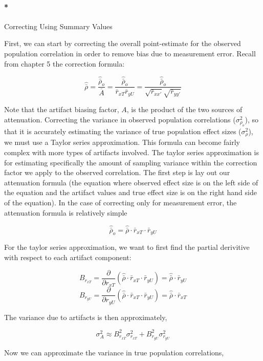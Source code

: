 \documentclass[
  letterpaper,
  DIV=11,
  numbers=noendperiod]{scrreprt}
\let\oldparagraph\paragraph
\renewcommand{\paragraph}[1]{\oldparagraph{#1}\mbox{}}
\begin{document}
\paragraph*{Correcting Using Summary
Values}\label{correcting-using-summary-values}

First, we can start by correcting the overall point-estimate for the
observed population correlation in order to remove bias due to
measurement error. Recall from chapter 5 the correction formula:

\[
\hat{\bar{\rho}} = \frac{\hat{\bar{\rho}}_o}{\bar{A}} = \frac{\hat{\bar{\rho}}_o}{\bar{r}_{xT} \bar{r}_{yU}} = \frac{\hat{\bar{\rho}}_o}{\sqrt{\bar{r}_{xx'}} \sqrt{\bar{r}_{yy'}}}
\]

Note that the artifact biasing factor, \(A\), is the product of the two
sources of attenuation. Correcting the variance in observed population
correlations (\(\sigma^2_{\rho_o}\)), so that it is accurately
estimating the variance of true population effect sizes
(\(\sigma^2_{\rho}\)), we must use a Taylor series approximation. This
formula can become fairly complex with more types of artifacts involved.
The taylor series approximation is for estimating specifically the
amount of sampling variance within the correction factor we apply to the
observed correlation. The first step is lay out our attenuation formula
(the equation where observed effect size is on the left side of the
equation and the artifact values and true effect size is on the right
hand side of the equation). In the case of correcting only for
measurement error, the attenuation formula is relatively simple

\[
\hat{\bar{\rho}}_o = \hat{\bar{\rho}}\cdot \bar{r}_{xT}\cdot \bar{r}_{yU}
\]

For the taylor series approximation, we want to first find the partial
derivitive with respect to each artifact component:

\[
B_{r_{xT}}=\frac{\partial}{\partial r_{xT}} (\hat{\bar{\rho}}\cdot \bar{r}_{xT}\cdot \bar{r}_{yU}) = \hat{\bar{\rho}}\cdot \bar{r}_{yU}
\] \[
B_{r_{yU}}=\frac{\partial}{\partial r_{yU}} (\hat{\bar{\rho}}\cdot \bar{r}_{xT}\cdot \bar{r}_{yU}) = \hat{\bar{\rho}}\cdot \bar{r}_{xT}
\]

The variance due to artifacts is then approximately,

\[
\sigma^2_A\approx B^2_{r_{xT}} \sigma^2_{r_{xT}} + B^2_{r_{yU}} \sigma^2_{r_{yU}}
\]

Now we can approximate the variance in true population correlations,
\end{document}

